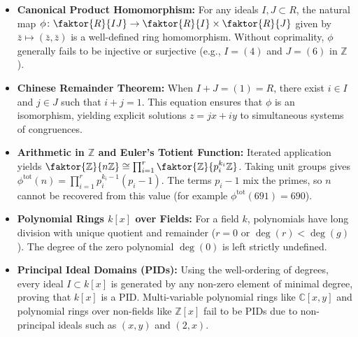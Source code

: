 \begin{overview}
\begin{itemize}
    \item \textbf{Canonical Product Homomorphism:} For any ideals $I, J \subset R$, the natural map $\phi \colon \faktor{R}{IJ} \to \faktor{R}{I} \times \faktor{R}{J}$ given by $\bar{z} \mapsto (\bar{z}, \bar{z})$ is a well-defined ring homomorphism. Without coprimality, $\phi$ generally fails to be injective or surjective (e.g., $I = (4)$ and $J = (6)$ in $\mathbb{Z}$).
    \item \textbf{Chinese Remainder Theorem:} When $I + J = (1) = R$, there exist $i \in I$ and $j \in J$ such that $i + j = 1$. This equation ensures that $\phi$ is an isomorphism, yielding explicit solutions $z = jx + iy$ to simultaneous systems of congruences.
    \item \textbf{Arithmetic in $\mathbb{Z}$ and Euler's Totient Function:} Iterated application yields $\faktor{\mathbb{Z}}{n\mathbb{Z}} \cong \prod_{i=1}^r \faktor{\mathbb{Z}}{p_i^{k_i}\mathbb{Z}}$. Taking unit groups gives $\phi^{\text{tot}}(n) = \prod_{i=1}^r p_i^{k_i - 1}(p_i - 1)$. The terms $p_i - 1$ mix the primes, so $n$ cannot be recovered from this value (for example $\phi^{\text{tot}}(691) = 690$).
    \item \textbf{Polynomial Rings $k[x]$ over Fields:} For a field $k$, polynomials have long division with unique quotient and remainder ($r = 0$ or $\deg(r) < \deg(g)$). The degree of the zero polynomial $\deg(0)$ is left strictly undefined.
    \item \textbf{Principal Ideal Domains (PIDs):} Using the well-ordering of degrees, every ideal $I \subset k[x]$ is generated by any non-zero element of minimal degree, proving that $k[x]$ is a PID. Multi-variable polynomial rings like $\mathbb{C}[x, y]$ and polynomial rings over non-fields like $\mathbb{Z}[x]$ fail to be PIDs due to non-principal ideals such as $(x, y)$ and $(2, x)$.
\end{itemize}
\end{overview}